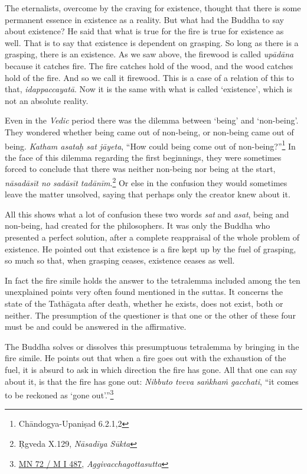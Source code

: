 The eternalists, overcome by the craving for existence, thought that there is some permanent essence in existence as a reality. But what had the Buddha to say about existence? He said that what is true for the fire is true for existence as well. That is to say that existence is dependent on grasping. So long as there is a grasping, there is an existence. As we saw above, the firewood is called \emph{upādāna} because it catches fire. The fire catches hold of the wood, and the wood catches hold of the fire. And so we call it firewood. This is a case of a relation of this to that, \emph{idappaccayatā}. Now it is the same with what is called `existence', which is not an absolute reality.

Even in the \emph{Vedic} period there was the dilemma between `being' and `non-being'. They wondered whether being came out of non-being, or non-being came out of being. \emph{Katham asataḥ sat jāyeta}, ``How could being come out of non-being?''\footnote{Chāndogya-Upaniṣad 6.2.1,2} In the face of this dilemma regarding the first beginnings, they were sometimes forced to conclude that there was neither non-being nor being at the start, \emph{nāsadāsīt no sadāsīt tadānīm}.\footnote{Ṛgveda X.129, \emph{Nāsadīya Sūkta}} Or else in the confusion they would sometimes leave the matter unsolved, saying that perhaps only the creator knew about it.

All this shows what a lot of confusion these two words \emph{sat} and \emph{asat}, being and non-being, had created for the philosophers. It was only the Buddha who presented a perfect solution, after a complete reappraisal of the whole problem of existence. He pointed out that existence is a fire kept up by the fuel of grasping, so much so that, when grasping ceases, existence ceases as well.

In fact the fire simile holds the answer to the tetralemma included among the ten unexplained points very often found mentioned in the suttas. It concerns the state of the Tathāgata after death, whether he exists, does not exist, both or neither. The presumption of the questioner is that one or the other of these four must be and could be answered in the affirmative.

The Buddha solves or dissolves this presumptuous tetralemma by bringing in the fire simile. He points out that when a fire goes out with the exhaustion of the fuel, it is absurd to ask in which direction the fire has gone. All that one can say about it, is that the fire has gone out: \emph{Nibbuto tveva saṅkhaṁ gacchati}, ``it comes to be reckoned as `gone out'.''\footnote{\href{https://suttacentral.net/mn72/pli/ms}{MN 72 / M I 487}, \emph{Aggivacchagottasutta}}

